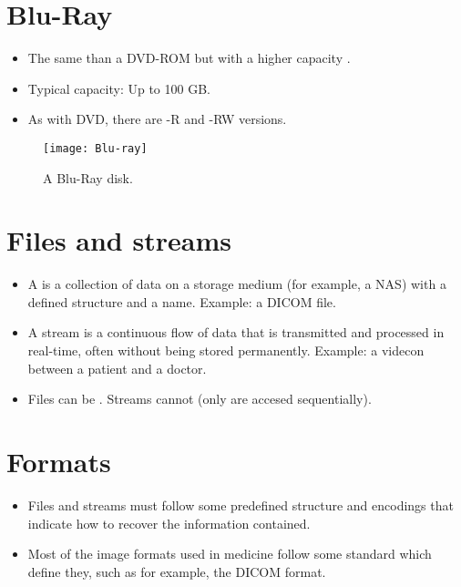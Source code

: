 \section{Blu-Ray}
\begin{itemize}
\item The same than a \gls{DVD-ROM} but with a higher capacity
  \cite{BR}.
\item Typical capacity: Up to 100 GB.
\item As with \gls{DVD}, there are -R and -RW versions.
\end{itemize}
\begin{figure}[H]
  \vspace{-16ex}
  \begin{flushright}
    \texttt{[image: Blu-ray]}
    \caption{A Blu-Ray disk.}
    \label{fig:Blu-Ray}
  \end{flushright}
\end{figure}

\section{Files and streams}
\begin{itemize}
\item A  is a collection of data  on a storage
medium (for example, a NAS) with a defined structure and a
name. Example: a DICOM file.
\item A stream is a continuous flow of data that is transmitted and
processed in real-time, often without being stored
permanently. Example: a videcon between a patient and a doctor.
\item Files can be . Streams cannot (only are accesed
sequentially).
\end{itemize}

\section{Formats}
\begin{itemize}
\item Files and streams must follow some predefined structure and
encodings that indicate how to recover the information contained.
\item Most of the image formats used in medicine follow some standard
which define they, such as for example, the DICOM format.
\end{itemize}

